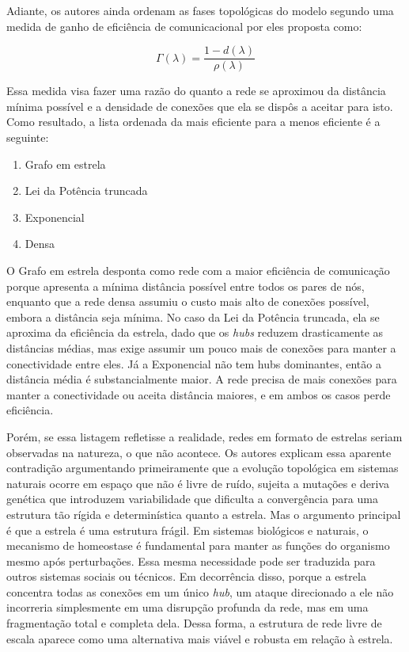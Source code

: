 \documentclass[12pt,oneside,a4paper,brazil,sumario=tradicional]{abntex2}
\begin{document}
Adiante, os autores ainda ordenam as fases topológicas do modelo segundo uma medida de ganho de eficiência de comunicacional por eles proposta como:

\[\Gamma(\lambda) = \frac{1-d(\lambda)}{\rho(\lambda)}\]

Essa medida visa fazer uma razão do quanto a rede se aproximou da distância mínima possível e a densidade de conexões que ela se dispôs a aceitar para isto. Como resultado, a lista ordenada da mais eficiente para a menos eficiente é a seguinte:

\begin{enumerate}
  \item Grafo em estrela
  \item Lei da Potência truncada
  \item Exponencial
  \item Densa
\end{enumerate}

O Grafo em estrela desponta como rede com a maior eficiência de comunicação porque apresenta a mínima distância possível entre todos os pares de nós, enquanto que a rede densa assumiu o custo mais alto de conexões possível, embora a distância seja mínima. No caso da Lei da Potência truncada, ela se aproxima da eficiência da estrela, dado que os \textit{hubs }reduzem drasticamente as distâncias médias, mas exige assumir um pouco mais de conexões para manter a conectividade entre eles. Já a Exponencial não tem hubs dominantes, então a distância média é substancialmente maior. A rede precisa de mais conexões para manter a conectividade ou aceita distância maiores, e em ambos os casos perde eficiência.

Porém, se essa listagem refletisse a realidade, redes em formato de estrelas seriam observadas na natureza, o que não acontece. Os autores explicam essa aparente contradição argumentando primeiramente que a evolução topológica em sistemas naturais ocorre em espaço que não é livre de ruído, sujeita a mutações e deriva genética que introduzem variabilidade que dificulta a convergência para uma estrutura tão rígida e determinística quanto a estrela. Mas o argumento principal é que a estrela é uma estrutura frágil. Em sistemas biológicos e naturais, o mecanismo de homeostase é fundamental para manter as funções do organismo mesmo após perturbações. Essa mesma necessidade pode ser traduzida para outros sistemas sociais ou técnicos. Em decorrência disso, porque a estrela concentra todas as conexões em um único \textit{hub}, um ataque direcionado a ele não incorreria simplesmente em uma disrupção profunda da rede, mas em uma fragmentação total e completa dela. Dessa forma, a estrutura de rede livre de escala aparece como uma alternativa mais viável e robusta em relação à estrela.
\end{document}
